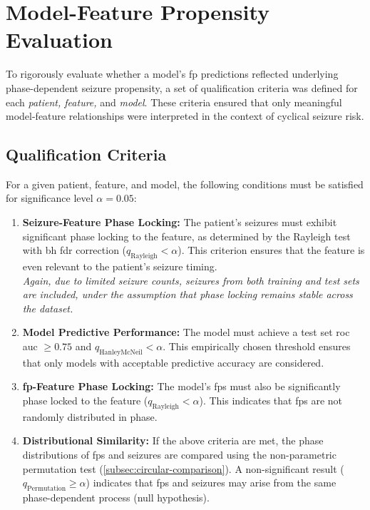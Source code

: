 \section{Model-Feature Propensity Evaluation} \label{sec:propensity-eval}

To rigorously evaluate whether a model's \gls{fp} predictions reflected underlying phase-dependent seizure propensity, a set of qualification criteria was defined for each \textit{patient, feature,} and \textit{model}.
These criteria ensured that only meaningful model-feature relationships were interpreted in the context of cyclical seizure risk.

\subsection{Qualification Criteria} \label{subsec:qualification-criteria}
For a given patient, feature, and model, the following conditions must be satisfied for significance level $\alpha = 0.05$:

\begin{enumerate}
    \item \textbf{Seizure-Feature Phase Locking:} The patient's seizures must exhibit significant phase locking to the feature, as determined by the Rayleigh test with \gls{bh} \gls{fdr} correction ($q_{\mathrm{Rayleigh}} < \alpha$). This criterion ensures that the feature is even relevant to the patient's seizure timing.\\
    \textit{Again, due to limited seizure counts, seizures from both training and test sets are included, under the assumption that phase locking remains stable across the dataset.}
    \item \textbf{Model Predictive Performance:} The model must achieve a test set \gls{roc auc} $\geq 0.75$ and $q_{\mathrm{HanleyMcNeil}}<\alpha$.
    This empirically chosen threshold ensures that only models with acceptable predictive accuracy are considered.
    \item \textbf{\gls{fp}-Feature Phase Locking:} The model's \glspl{fp} must also be significantly phase locked to the feature ($q_{\mathrm{Rayleigh}} < \alpha$). This indicates that \glspl{fp} are not randomly distributed in phase.
    \item \textbf{Distributional Similarity:} If the above criteria are met, the phase distributions of \glspl{fp} and seizures are compared using the non-parametric permutation test (\cref{subsec:circular-comparison}). A non-significant result ($q_{\mathrm{Permutation}} \geq \alpha$) indicates that \glspl{fp} and seizures may arise from the same phase-dependent process (null hypothesis).
\end{enumerate}

